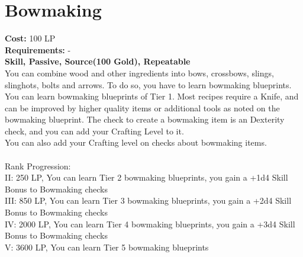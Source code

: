 \section{Bowmaking}\label{perk:bowmaking}
\textbf{Cost:} 100 LP\\
\textbf{Requirements:} -\\
\textbf{Skill, Passive, Source(100 Gold), Repeatable}\\
You can combine wood and other ingredients into bows, crossbows, slings, slinghots, bolts and arrows.
To do so, you have to learn bowmaking blueprints.
You can learn bowmaking blueprints of Tier 1.
Most recipes require a Knife, and can be improved by higher quality items or additional tools as noted on the bowmaking blueprint.
The check to create a bowmaking item is an Dexterity check, and you can add your Crafting Level to it.\\
You can also add your Crafting level on checks about bowmaking items.\\
\\
Rank Progression:\\
II: 250 LP, You can learn Tier 2 bowmaking blueprints, you gain a +1d4 Skill Bonus to Bowmaking checks\\
III: 850 LP, You can learn Tier 3 bowmaking blueprints, you gain a +2d4 Skill Bonus to Bowmaking checks\\
IV: 2000 LP, You can learn Tier 4 bowmaking blueprints, you gain a +3d4 Skill Bonus to Bowmaking checks\\
V: 3600 LP, You can learn Tier 5 bowmaking blueprints\\